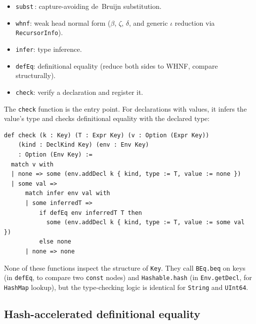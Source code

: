 \begin{itemize}
\item \texttt{subst}\,: capture-avoiding de~Bruijn substitution.
\item \texttt{whnf}: weak head normal form ($\beta$, $\zeta$, $\delta$, and generic $\iota$ reduction via \texttt{RecursorInfo}).
\item \texttt{infer}: type inference.
\item \texttt{defEq}: definitional equality (reduce both sides to WHNF, compare structurally).
\item \texttt{check}: verify a declaration and register it.
\end{itemize}

The \texttt{check} function is the entry point.  For declarations with values, it infers the value's type and checks definitional equality with the declared type:

\begin{lstlisting}[language={},morekeywords={def,match,with,some,none,if,then,else}]
def check (k : Key) (T : Expr Key) (v : Option (Expr Key))
    (kind : DeclKind Key) (env : Env Key)
    : Option (Env Key) :=
  match v with
  | none => some (env.addDecl k { kind, type := T, value := none })
  | some val =>
      match infer env val with
      | some inferredT =>
          if defEq env inferredT T then
            some (env.addDecl k { kind, type := T, value := some val })
          else none
      | none => none
\end{lstlisting}

None of these functions inspect the structure of \texttt{Key}.  They call \texttt{BEq.beq} on keys (in \texttt{defEq}, to compare two \texttt{const} nodes) and \texttt{Hashable.hash} (in \texttt{Env.getDecl}, for \texttt{HashMap} lookup), but the type-checking logic is identical for \texttt{String} and \texttt{UInt64}.

\subsection{Hash-accelerated definitional equality}\label{sec:exprwithhash}

